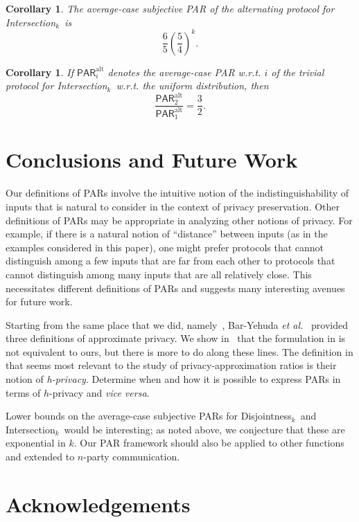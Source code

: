 \documentclass{article}
\theoremstyle{theorem}
\newtheorem{cor}[theorem]{Corollary}
\theoremstyle{definition}
\theoremstyle{remark}
\newcommand{\PAR}{\ensuremath{\mathsf{PAR}}}
\newcommand{\disjoint}{{\sc Dis\-joint\-ness}\ensuremath{_k}}
\newcommand{\intersection}{{\sc In\-ter\-sec\-tion}\ensuremath{_k}}
\begin{document}
\begin{cor}
The average-case subjective PAR of the alternating protocol for \intersection\ is
\[
\frac{6}{5}\left(\frac{5}{4}\right)^k.
\]
\end{cor}

\begin{cor}
If $\PAR^\mathrm{alt}_i$ denotes the average-case PAR w.r.t. $i$ of the trivial protocol for \intersection\ w.r.t. the uniform distribution, then
\[
\frac{\PAR^\mathrm{alt}_2}{\PAR^\mathrm{alt}_1} = \frac{3}{2}.
\]
\end{cor}

\section{Conclusions and Future Work}\label{sec:conc}



Our definitions of PARs involve the intuitive notion of the
indistinguishability of inputs that is natural to consider in the
context of privacy preservation. Other definitions of PARs may be
appropriate in analyzing other notions of privacy. For example, if
there is a natural notion of ``distance'' between inputs (as
in the examples considered in this paper), one might prefer
protocols that cannot distinguish among a few inputs that are far
from each other to protocols that cannot distinguish among many
inputs that are all relatively close. This necessitates different
definitions of PARs and suggests many interesting avenues for
future work.

Starting from the same place that we did,
namely~\cite{CK91,K92}, Bar-Yehuda {\it et al.}~\cite{BCKO} provided
three definitions of approximate privacy.  We show in~\cite{fjs09tr14} that
the formulation in \cite{BCKO} is not equivalent to ours, but there is more
to do along these lines.  The definition in \cite{BCKO} that seems most
relevant to the study of privacy-approximation ratios is their
notion of {\it h-privacy}. Determine when and how it is possible to
express PARs in terms of $h$-privacy and {\it vice versa}.

Lower bounds on the average-case subjective PARs for \disjoint\ and \intersection\ would be interesting; as noted above, we conjecture that these are exponential in $k$.  Our PAR framework should also be applied to other functions and extended to $n$-party communication.



\section*{Acknowledgements}
\end{document}
